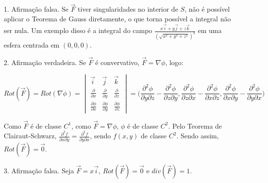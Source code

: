 \documentclass[12pt,a4paper]{article}
\begin{document}
\begin{itemize}
	\item[1.] Afirmação falsa. Se $\vec{F}$ tiver singularidades no interior de $S$, não é possível aplicar o Teorema de Gauss diretamente, o que torna possível a integral não ser nula. Um exemplo disso é a integral do campo $\displaystyle\frac{x\vec{i} + y\vec{j} + z\vec{k}}{(\sqrt{x^2 + y^2 + z^2})^3}$ em uma esfera centrada em $(0,0,0)$.

	\item[2.] Afirmação verdadeira. Se $\vec{F}$ é convervativo, $\vec{F} = \nabla \phi $, logo:
	
	$$ Rot(\vec{F}) = Rot(\nabla\phi) = \begin{vmatrix}
	\vec{i} & \vec{j} & \vec{k} \\
	\frac{\partial}{\partial x} & \frac{\partial}{\partial y} & \frac{\partial}{\partial z} \\
	\frac{\partial \phi}{\partial x} & \frac{\partial \phi}{\partial y} & \frac{\partial \phi}{\partial z}
    \end{vmatrix} = \Big(\frac{\partial^2 \phi}{\partial y \partial z} - \frac{\partial^2 \phi}{\partial z \partial y} ,               \frac{\partial^2 \phi}{\partial z \partial x} - \frac{\partial^2 \phi}{\partial x \partial z}, \frac{\partial^2 \phi}{\partial x \partial y} - \frac{\partial^2 \phi}{\partial y \partial x}\Big)	 $$
    
    Como $\vec{F}$ é de classe $C^1$, como $\vec{F} = \nabla \phi $, $\phi$ é de classe $C^2$. Pelo Teorema de Clairaut-Schwarz, $\frac{\partial^2 f}{\partial x \partial y} = \frac{\partial^2 f}{\partial y \partial x}$, sendo $f(x,y)$ de classe $C^2$. Sendo assim, $Rot(\vec{F}) = \vec{0}$.
	
	\item[3.] Afirmação falsa. Seja $\vec{F} = x\vec{i}$, $Rot(\vec{F}) = \vec{0}$ e $div(\vec{F}) = 1$.

 \end{itemize}
\end{document}
